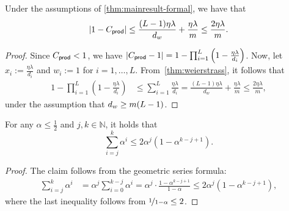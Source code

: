 \begin{lemma}
	\label{lemma:one-minus-folded-product}
	Under the assumptions of \cref{thm:mainresult-formal}, we have that
	\begin{equation}
		|1 - C_{\mathsf{prod}}|
		\leq
		\frac{(L - 1) \eta \lambda}{d_w} +
		\frac{\eta \lambda}{m} \leq \frac{2 \eta \lambda}{m}.
		\label{eq:one-minus-folded-product}
	\end{equation}
\end{lemma}
\begin{proof}
	Since $C_{\mathsf{prod}} < 1$, we have
	$|C_{\mathsf{prod}} - 1| =
		1 - \prod_{i = 1}^{L}
		\left(1 - \frac{\eta \lambda}{d_i}\right)$.
	Now, let $x_i := \frac{\eta \lambda}{d_i}$ and $w_i := 1$ for $i = 1, \dots, L$. From~\cref{thm:weierstrass},
	it follows that
	\begin{align*}
		1 - \prod_{i = 1}^L
		\left(1 - \frac{\eta \lambda}{d_i}\right) & \leq
		\sum_{i = 1}^L \frac{\eta \lambda}{d_i} =
		\frac{(L - 1) \eta \lambda}{d_{w}} +
		\frac{\eta \lambda}{m}
		\leq \frac{2 \eta \lambda}{m},
	\end{align*}
    under the assumption that $d_{w} \ge m(L-1)$.
\end{proof}
\begin{lemma}
    \label{lemma:truncated-geometric-series}
    For any $\alpha \leq \frac{1}{2}$ and $j, k \in \mathbb{N}$, it holds that
    \begin{equation}
        \sum_{i = j}^k \alpha^{i} \leq
        2 \alpha^j (1 - \alpha^{k - j + 1}).
    \end{equation}
\end{lemma}
\begin{proof}
    The claim follows from the geometric series formula:
    \begin{align*}
       \sum_{i = j}^k \alpha^i &=
       \alpha^j \sum_{i = 0}^{k- j } \alpha^i
       =
       \alpha^j \cdot \frac{1 - \alpha^{k - j + 1}}{1 - \alpha}
       \leq
       2 \alpha^j (1 - \alpha^{k - j + 1}),
    \end{align*}
    where the last inequality follows from  $\nicefrac{1}{1 - \alpha} \leq 2$.
\end{proof}
